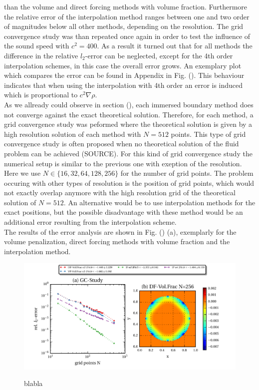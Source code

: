 than the volume and direct forcing methods with volume fraction. Furthermore the relative error of the interpolation method ranges
between one and two order of magnitudes below all other methods, depending on the resolution.
The grid convergence study was than repeated once again in order to test the influence of the sound speed with $c^2 = 400$.
As a result it turned out that for all methods the difference in the relative $l_2$-error can be neglected, except
for the 4th order interpolation schemes, in this case the overall error grows. An exemplary plot which compares
the error can be found in Appendix in Fig. (). This behaviour indicates that when using the interpolation with 4th order
an error is induced which is proportional to $c^2\nabla \rho$.\\
As we allready could observe in section (), each immersed boundary method does not converge against the exact theoretical solution.
Therefore, for each method, a grid convergence study was peformed where the theoretical solution is given by a
high resolution solution of each method with $N=512$ points. This type of grid convergence study is often proposed
when no theoretical solution of the fluid problem can be achieved (SOURCE).
For this kind of grid convergence study the numerical setup is similar to the previous one with exeption of the resolution.
Here we use $N\in\{16, 32, 64, 128, 256\}$ for the number of grid points.
The problem occuring with other types of resolution is the position of grid points, which would not exactly overlap anymore with
the high resolution grid  of the theoretical solution of $N=512$.
An alternative would be to use interpolation methods for the exact positions, but the possible disadvantage with these method
would be an additional error resulting from the interpolation scheme.\\
The results of the error analysis are shown in Fig. () (a), exemplarly for the volume penalization, direct forcing  methods with volume fraction
and the interpolation method.

\begin{figure}[!pb]
  \centering
  \includegraphics{gfx/immersed_boundary/hpflow/hd/all.pdf}\label{fig:hpflow_allgc_theo}
  \caption{blabla}
\end{figure}

